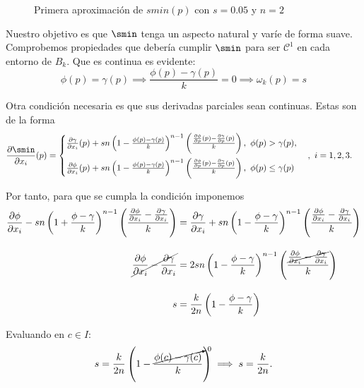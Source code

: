 \begin{figure}[!h]
\begin{minipage}[c]{0.49\linewidth}
        \caption{$k=0.1$}
     \end{minipage}
     \caption{Primera aproximación de $smin(p)$ con $s=0.05$ y $n=2$}
     \label{fig:smooth1}
\end{figure}

Nuestro objetivo es que $\smin$ tenga un aspecto natural y varíe de forma suave. Comprobemos propiedades que debería cumplir $\smin$ para ser $\mathcal{C}^1$ en cada entorno de $B_k$. Que es continua es evidente:
\begin{equation*}
    \phi(p)=\gamma(p) \implies \frac{\phi(p)-\gamma(p)}{k} = 0\implies \omega_k(p) = s
\end{equation*}

Otra condición necesaria es que sus derivadas parciales sean continuas. Estas son de la forma
\begin{align*}
    \frac{\partial \smin}{\partial x_i}(p) &= \begin{cases}
        \frac{\partial \gamma}{\partial x_i}(p)+ sn\left(1-\frac{\phi(p)-\gamma(p)}{k}\right)^{n-1}\left(\frac{ \frac{\partial \phi}{\partial p}(p)-\frac{\partial \gamma}{\partial p}(p)}{k}\right),\ \phi(p)>\gamma(p), \\[10pt] 
        \frac{\partial \phi}{\partial x_i}(p)+ sn\left(1-\frac{\phi(p)-\gamma(p)}{k}\right)^{n-1}\left(\frac{ \frac{\partial \phi}{\partial p}(p)-\frac{\partial \gamma}{\partial p}(p)}{k}\right),\ \phi(p)\le\gamma(p)
    \end{cases},\ i=1,2,3.
\end{align*}

Por tanto, para que se cumpla la condición imponemos 
\begin{align*}
     \frac{\partial \phi}{\partial x_i} - sn\left(1+\frac{\phi-\gamma}{k}\right)^{n-1}\left(\frac{\frac{\partial \phi}{\partial x_i}-\frac{\partial \gamma}{\partial x_i}}{k}\right) &= \frac{\partial \gamma}{\partial x_i} + sn\left(1-\frac{\phi-\gamma}{k}\right)^{n-1}\left(\frac{\frac{\partial \phi}{\partial x_i}-\frac{\partial \gamma}{\partial x_i}}{k}\right)\\[10pt]
     \cancel{\frac{\partial \phi}{\partial x_i} - \frac{\partial \gamma}{\partial x_i}} &= 2sn\left(1-\frac{\phi-\gamma}{k}\right)^{n-1}\left(\frac{ \cancel{\frac{\partial \phi}{\partial x_i}-\frac{\partial \gamma}{\partial x_i}}}{k}\right)\\[10pt]
     s &= \frac{k}{2n}\left(1-\frac{\phi-\gamma}{k}\right)
\end{align*}

Evaluando en $c\in I$:
\begin{align*}
    s = \frac{k}{2n}\left(1-\frac{\cancelto{0}{\phi(c)-\gamma(c)}}{k}\right) \implies s = \frac{k}{2n}.
\end{align*}
    
